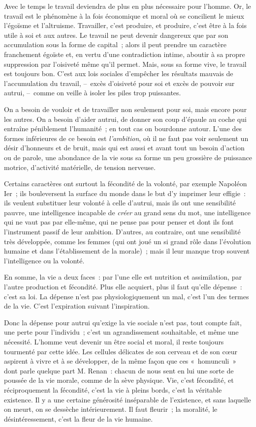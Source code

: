 \documentclass[french,twoside]{book} %
\begin{document}
Avec le temps le travail deviendra de plus en plus nécessaire pour l’homme. Or, le travail est le phénomène à la fois économique et moral où se concilient le mieux l’égoïsme et l’altruisme. Travailler, c’est produire, et produire, c’est être à la fois utile à soi et aux autres. Le travail ne peut devenir dangereux que par son accumulation sous la forme de capital ; alors il peut prendre un caractère franchement égoïste et, en vertu d’une contradiction intime, aboutir à sa propre suppression par l’oisiveté même qu’il permet. Mais, sous sa forme vive, le travail est toujours bon. C’est aux lois sociales d’empêcher les résultats mauvais de l’accumulation du travail, – excès d’oisiveté pour soi et excès de pouvoir sur autrui, – comme on veille à isoler les piles trop puissantes.\par
On a besoin de vouloir et de travailler non seulement pour soi, mais encore pour les autres. On a besoin d’aider autrui, de donner son coup d’épaule au coche qui entraîne péniblement l’humanité ; en tout cas on bourdonne autour. L’une des formes inférieures de ce besoin est \emph{l’ambition}, où il ne faut pas voir seulement un désir d’honneurs et de bruit, mais qui est aussi et avant tout un besoin d’action ou de parole, une abondance de la vie sous sa forme un peu grossière de puissance motrice, d’activité matérielle, de tension nerveuse.\par
Certains caractères ont surtout la fécondité de la volonté, par exemple Napoléon Ier ; ils bouleversent la surface du monde dans le but d’y imprimer leur effigie : ils veulent substituer leur volonté à celle d’autrui, mais ils ont une sensibilité pauvre, une intelligence incapable de \emph{créer} au grand sens du mot, une intelligence qui ne vaut pas par elle-même, qui ne pense pas pour penser et dont ils font l’instrument passif de leur ambition. D’autres, au contraire, ont une sensibilité très développée, comme les femmes (qui ont joué un si grand rôle dans l’évolution humaine et dans l’établissement de la morale) ; mais il leur manque trop souvent l’intelligence ou la volonté.\par
En somme, la vie a deux faces : par l’une elle est nutrition et assimilation, par l’autre production et fécondité. Plus elle acquiert, plus il faut qu’elle dépense : c’est sa loi. La dépense n’est pas physiologiquement un mal, c’est l’un des termes de la vie. C’est l’expiration suivant l’inspiration.\par
Donc la dépense pour autrui qu’exige la vie sociale n’est pas, tout compte fait, une perte pour l’individu ; c’est un agrandissement souhaitable, et même une nécessité. L’homme veut devenir un être social et moral, il reste toujours tourmenté par cette idée. Les cellules délicates de son cerveau et de son cœur aspirent à vivre et à se développer, de la même façon que ces « homunculi » dont parle quelque part M. Renan : chacun de nous sent en lui une sorte de poussée de la vie morale, comme de la sève physique. Vie, c’est fécondité, et réciproquement la fécondité, c’est la vie à pleins bords, c’est la véritable existence. Il y a une certaine générosité inséparable de l’existence, et sans laquelle on meurt, on se dessèche intérieurement. Il faut fleurir ; la moralité, le désintéressement, c’est la fleur de la vie humaine.\par
\end{document}
